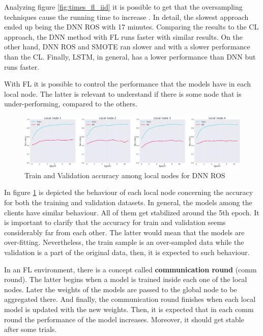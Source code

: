 Analyzing figure \ref{fig:times_fl_iid} it is possible to get that the oversampling techniques cause the running time to increase \cite{fl28}. In detail, the slowest approach ended up being the DNN ROS with 17 minutes. Comparing the results to the CL approach, the DNN method with FL runs faster with similar results. On the other hand, DNN ROS and SMOTE ran slower and with a slower performance than the CL. Finally, LSTM, in general, has a lower performance than DNN but runs faster.

With FL it is possible to control the performance that the models have in each local node. The latter is relevant to understand if there is some node that is under-performing, compared to the others.

\begin{figure}[H]
\centering
\includegraphics[scale=0.38]{img/iid_local_nodes_acc.png}
\caption{Train and Validation accuracy among local nodes for DNN ROS}
\label{fig:iid_local_nodes_acc}
\end{figure}

In figure \ref{fig:iid_local_nodes_acc} is depicted the behaviour of each local node concerning the accuracy for both the training and validation datasets. In general, the models among the clients have similar behaviour. All of them get stabilized around the 5th epoch. It is important to clarify that the accuracy for train and validation seems considerably far from each other. The latter would mean that the models are over-fitting. Nevertheless, the train sample is an over-sampled data while the validation is a part of the original data, then, it is expected to such behaviour.

In an FL environment, there is a concept called \textbf{communication round} (comm round). The latter begins when a model is trained inside each one of the local nodes. Later the weights of the models are passed to the global node to be aggregated there. And finally, the communication round finishes when each local model is updated with the new weights. Then, it is expected that in each comm round the performance of the model increases. Moreover, it should get stable after some trials.

